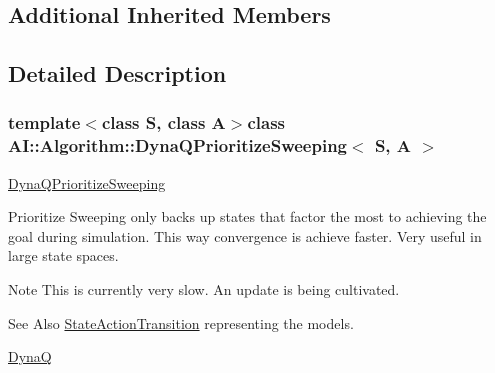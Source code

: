\subsection*{Additional Inherited Members}


\subsection{Detailed Description}
\subsubsection*{template$<$class S, class A$>$class A\-I\-::\-Algorithm\-::\-Dyna\-Q\-Prioritize\-Sweeping$<$ S, A $>$}

\hyperlink{classAI_1_1Algorithm_1_1DynaQPrioritizeSweeping}{Dyna\-Q\-Prioritize\-Sweeping} 

Prioritize Sweeping only backs up states that factor the most to achieving the goal during simulation. This way convergence is achieve faster. Very useful in large state spaces.

\begin{DoxyNote}{Note}
This is currently very slow. An update is being cultivated.
\end{DoxyNote}
\begin{DoxySeeAlso}{See Also}
\hyperlink{classAI_1_1Algorithm_1_1StateActionTransition}{State\-Action\-Transition} representing the models.

\hyperlink{classAI_1_1Algorithm_1_1DynaQ}{Dyna\-Q} 
\end{DoxySeeAlso}



